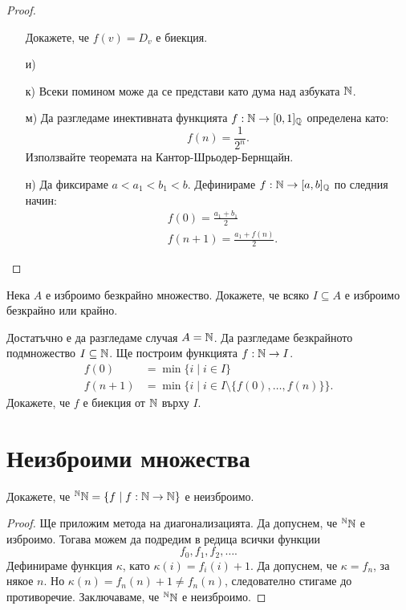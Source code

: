 \begin{proof}
\begin{enumerate}[a)]
    Докажете, че $f(v) = D_v$ е биекция.
  \item[и)]
    
  \item[к)]
    Всеки помином може да се представи като дума над азбуката $\mathbb{N}$.
  \item[м)]
    Да разгледаме инективната функцията $f:\mathbb{N} \to [0,1]_{\mathbb{Q}}$ определена като:
    \[f(n) = \frac{1}{2^n}.\]
    Използвайте теоремата на Кантор-Шрьодер-Бернщайн.
  \item[н)]
    Да фиксираме $a < a_1 < b_1 < b$.
    Дефинираме $f:\mathbb{N} \to [a,b]_{\mathbb{Q}}$ по следния начин:
    \begin{align*}
      & f(0) = \frac{a_1+b_1}{2}\\
      & f(n+1) = \frac{a_1+f(n)}{2}.
    \end{align*}
  \end{enumerate}
\end{proof}


\begin{problem}
  Нека $A$ е изброимо безкрайно множество.
  Докажете, че всяко $I \subseteq A$ е изброимо безкрайно или крайно.
\end{problem}
\begin{hint}
  Достатъчно е да разгледаме случая $A = \mathbb{N}$.
  Да разгледаме безкрайното подмножество $I \subseteq \mathbb{N}$.
  Ще построим функцията $f:\mathbb{N} \to I$.
  \begin{align*}
    f(0)   & = \min\{i \mid i \in I\}\\
    f(n+1) &= \min\{i \mid i \in I \setminus\{f(0),\dots,f(n)\}\}.
  \end{align*}
  Докажете, че $f$ е биекция от $\mathbb{N}$ върху $I$.
\end{hint}

\section{Неизброими множества}

\begin{problem}
  Докажете, че $^{\mathbb{N}}\mathbb{N} = \{f \mid f:\mathbb{N} \to \mathbb{N}\}$ е неизброимо.
\end{problem}
\begin{proof}
  Ще приложим метода на диагонализацията. 
  Да допуснем, че $^{\mathbb{N}}\mathbb{N}$ е изброимо.
  Тогава можем да подредим в редица всички функции \[f_0,f_1,f_2,\dots.\]
  Дефинираме функция $\kappa$, като $\kappa(i) = f_i(i)+1$.
  Да допуснем, че $\kappa = f_n$, за някое $n$.
  Но $\kappa(n) = f_n(n)+1 \neq f_n(n)$, следователно стигаме до противоречие.
  Заключаваме, че $^{\mathbb{N}}\mathbb{N}$ е неизброимо.
\end{proof}

